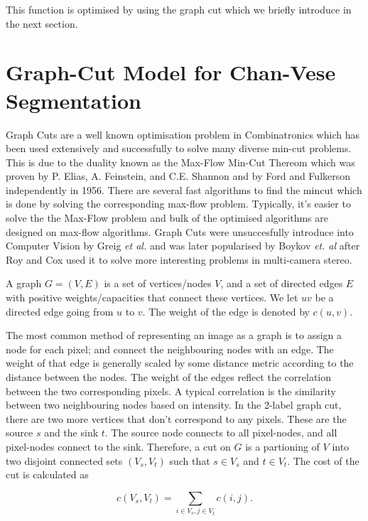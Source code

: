 \documentclass[10pt, journal, letterpaper, onecolumn, draftcls]{IEEEtran}
\begin{document}
This function is optimised by using the graph cut which we briefly introduce in the next section.

\section{Graph-Cut Model for Chan-Vese Segmentation}
\label{sec:CVgraphcut}
Graph Cuts are a well known optimisation problem in Combinatronics which has been used extensively and successfully to solve many diverse min-cut problems. This is due to the duality known as the Max-Flow Min-Cut Thereom which was proven by P. Elias, A. Feinstein, and C.E. Shannon \cite{Elias1956} and by Ford and Fulkerson \cite{Ford1956} independently in 1956. There are several fast algorithms to find the mincut which is done by solving the corresponding max-flow problem. Typically, it's easier to solve the the Max-Flow problem and bulk of the optimised algorithms are designed on max-flow algorithms. Graph Cuts were unsuccesfully introduce into Computer Vision by Greig \textit{et al.} \cite{Greig1989} and was later popularised by Boykov \textit{et. al} \cite{Boykov1998} after Roy and Cox \cite{Roy1998} used it to solve more interesting problems in multi-camera stereo.

A graph $G=(V, E)$ is a set of vertices/nodes $V$, and a set of directed edges $E$ with positive weights/capacities that connect these vertices. We let $uv$ be a directed edge going from $u$ to $v$. The weight of the edge is denoted by $c(u, v)$.

The most common method of representing an image as a graph is to assign a node for each pixel; and  connect the neighbouring nodes with an edge. The weight of that edge is generally scaled by some distance metric according to the distance between the nodes. The weight of the edges reflect the correlation between the two corresponding pixels. A typical correlation is the similarity between two neighbouring nodes based on intensity. In the 2-label graph cut, there are two more vertices that don't correspond to any pixels. These are the source $s$ and the sink $t$. The source node connects to all pixel-nodes, and all pixel-nodes connect to the sink. Therefore, a cut on $G$ is a partioning of $V$ into two disjoint connected sets $(V_s, V_t)$ such that $s \in V_s$ and $t \in V_t$. The cost of the cut is calculated as

\begin{equation}
	c(V_s, V_t) = \sum_{i \in V_s, j \in V_t}c(i, j).
\end{equation}
\end{document}

